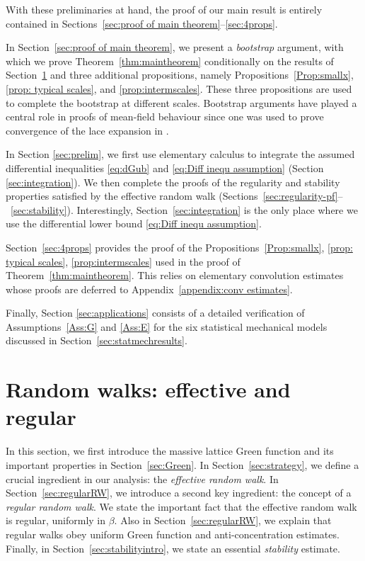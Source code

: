 \documentclass[11pt,a4paper]{article}
\numberwithin{equation}{section}
\theoremstyle{plain}
\theoremstyle{definition}
\newcommand\1{\mathds{1}}
\begin{document}
With these preliminaries at hand,
the proof of our main result is entirely contained in Sections~\ref{sec:proof of main theorem}--\ref{sec:4props}.

In Section~\ref{sec:proof of main theorem}, we present a \emph{bootstrap} argument,
with which we prove Theorem~\ref{thm:maintheorem} conditionally on the results of Section~\ref{sec: strategy of the proof} and three additional propositions, namely
Propositions~\ref{Prop:smallx},
\ref{prop: typical scales}, and \ref{prop:intermscales}.  These three propositions
are used to complete the bootstrap at different scales.
Bootstrap arguments have played a central role in proofs of mean-field behaviour since
one was used
to prove convergence of the lace expansion in \cite{Slad87}.

In Section \ref{sec:prelim}, we first use
elementary calculus to integrate the assumed differential
inequalities \eqref{eq:dGub} and \eqref{eq:Diff inequ assumption}
(Section \ref{sec:integration}).  We then complete the proofs of the
regularity and stability properties satisfied by the effective random walk (Sections~\ref{sec:regularity-pf}--~\ref{sec:stability}). Interestingly, Section~\ref{sec:integration} is the only place where we use the
differential lower bound \eqref{eq:Diff inequ assumption}.

Section~\ref{sec:4props} provides the proof of the
Propositions~\ref{Prop:smallx},
\ref{prop: typical scales}, \ref{prop:intermscales} used in the proof of Theorem~\ref{thm:maintheorem}. This relies on elementary convolution estimates
whose proofs are deferred to Appendix~\ref{appendix:conv estimates}.

Finally, Section \ref{sec:applications} consists of a detailed verification of
Assumptions~\ref{Ass:G} and \ref{Ass:E} for the six statistical mechanical
models discussed in Section~\ref{sec:statmechresults}.


\section{Random walks: effective and regular}
\label{sec: strategy of the proof}

In this section, we first introduce the massive lattice Green function and
its important properties in Section~\ref{sec:Green}.
In Section~\ref{sec:strategy}, we define a crucial ingredient in our
analysis: the \emph{effective random walk}.
In Section~\ref{sec:regularRW}, we introduce a second key
ingredient: the concept of a \emph{regular random walk}. We state the important fact
that the effective random walk is regular, uniformly in $\beta$.
Also in Section~\ref{sec:regularRW}, we explain that regular walks obey
uniform Green function and anti-concentration estimates.
Finally, in Section~\ref{sec:stabilityintro}, we state an essential \emph{stability} estimate.
\end{document}
